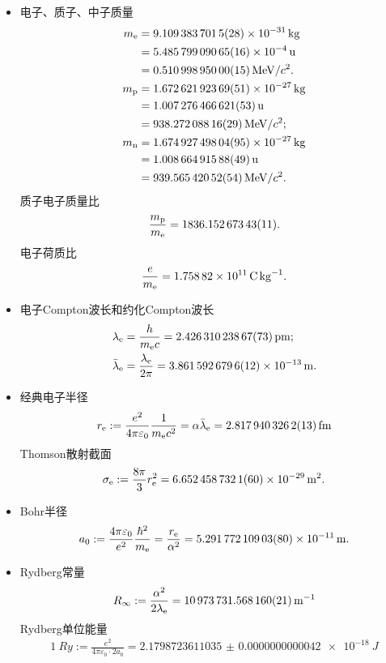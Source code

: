 \begin{itemize}
	\item 电子、质子、中子质量
		\begin{align}
			m_\electron &= \qty{9.1093837015(28)E-31}{kg}\label{eq:nrd-electron-mass}\\
			&= \qty{5.48579909065(16)E-4}{u}\notag\\
			&= \qty{0.51099895000(15)}{MeV}/c^2.\notag\\
			m_\proton &= \qty{1.67262192369(51)E-27}{kg}\label{eq:nrd-proton-mass}\\
			&= \qty{1.007276466621(53)}{u}\notag\\
			&= \qty{938.27208816(29)}{MeV}/c^2;\notag\\
			m_\neutron &= \qty{1.67492749804(95)E-27}{kg}\label{eq:nrd-neutron-mass}\\
			&= \qty{1.00866491588(49)}{u}\notag\\
			&= \qty{939.56542052(54)}{MeV}/c^2.\notag
		\end{align}
		质子电子质量比
		\begin{align}
			\frac{m_\proton}{m_\electron} = \num{1836.15267343(11)}.
		\end{align}
		电子荷质比
		\begin{align}
			\frac e{m_\electron} = \qty{1.75882E11}{\coulomb\per\kilogram}.
		\end{align}

	\item 电子Compton波长和约化Compton波长
		\begin{align}
			\lambda_\electron &= \frac h{m_\electron c} = \qty{2.42631023867(73)}{pm};\\
			\lambdabar_\electron &= \frac{\lambda_\electron}{2\pi} = \qty{3.861 592 6796(12)E-13}{m}.
		\end{align}

	\item 经典电子半径
		\begin{align}
			r_\electron := \frac{e^2}{4\pi\varepsilon_0}\frac1{m_\electron c^2} = \alpha\lambdabar_\electron = \qty{2.8179403262(13)}{fm}
		\end{align}
		Thomson散射截面
		\begin{align}
			\sigma_\electron := \frac{8\pi}3r_\electron^2 = \qty{6.6524587321(60)E-29}{\metre\squared}.
		\end{align}



	\item Bohr半径
		\begin{align}
			a_0 := \frac{4\pi\varepsilon_0}{e^2}\frac{\hbar^2}{m_\electron} = \frac{r_\electron}{\alpha^2} = \qty{5.29177210903(80)E-11}{m}.
		\end{align}
	\item Rydberg常量
		\begin{align}
			R_\infty := \frac{\alpha^2}{2\lambda_\electron} = \qty{10973731.568160(21)}{\per\metre}
		\end{align}
		Rydberg单位能量
		\begin{align}
			\qty{1}{Ry} := \frac{e^2}{4\pi\varepsilon_0 \cdot 2a_0} = \qty{2.1798723611035(42)e-18}{J}
		\end{align}


\end{itemize}
